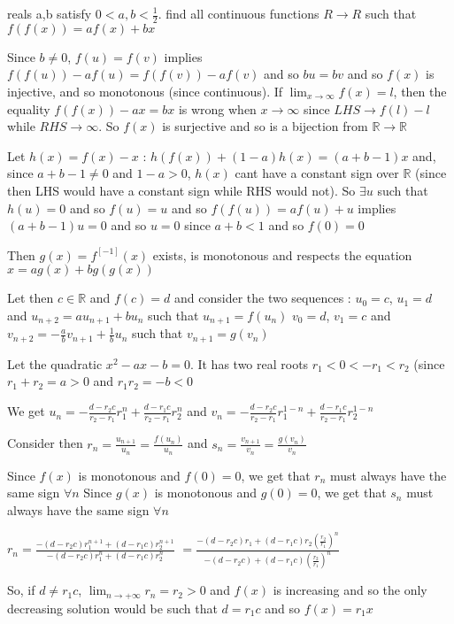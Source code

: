 \begin{solution}
	\begin{tcolorbox}reals a,b satisfy $ 0 < a,b < \frac {1}{2}$. find all continuous functions $ R \to R$ such that $ f(f(x)) = af(x) + bx$\end{tcolorbox}

Since $ b\ne 0$, $ f(u)=f(v)$ implies $ f(f(u))-af(u)=f(f(v))-af(v)$ and so $ bu=bv$ and so $ f(x)$ is injective, and so monotonous (since continuous).
If $ \lim_{x\to\infty}f(x)=l$, then the equality $ f(f(x))-ax=bx$ is wrong when $ x\to\infty$ since $ LHS\to f(l)-l$ while $ RHS\to\infty$. So $ f(x)$ is surjective and so is a bijection from $ \mathbb R\to\mathbb R$

Let $ h(x)=f(x)-x$ : $ h(f(x))+(1-a)h(x)=(a+b-1)x$ and, since $ a+b-1\ne 0$ and $ 1-a>0$, $ h(x)$ cant have a constant sign over $ \mathbb R$ (since then LHS would have a constant sign while RHS would not). So $ \exists u$ such that $ h(u)=0$ and so $ f(u)=u$ and so $ f(f(u))=af(u)+u$ implies $ (a+b-1)u=0$ and so $ u=0$ since $ a+b<1$ and so $ f(0)=0$


Then $ g(x)=f^{[-1]}(x)$ exists, is monotonous and respects the equation $ x=ag(x)+bg(g(x))$

Let then $ c\in\mathbb R$ and $ f(c)=d$ and consider the two sequences :
$ u_0=c$, $ u_1=d$ and $ u_{n+2}=au_{n+1}+bu_n$ such that $ u_{n+1}=f(u_n)$
$ v_0=d$, $ v_1=c$ and $ v_{n+2}=-\frac abv_{n+1}+\frac 1bu_n$ such that $ v_{n+1}=g(v_n)$

Let the quadratic $ x^2-ax-b=0$. It has two real roots $ r_1<0<-r_1<r_2$ (since $ r_1+r_2=a>0$ and $ r_1r_2=-b<0$

We get $ u_n=-\frac{d-r_2c}{r_2-r_1}r_1^n+\frac{d-r_1c}{r_2-r_1}r_2^n$ and $ v_n=-\frac{d-r_2c}{r_2-r_1}r_1^{1-n}+\frac{d-r_1c}{r_2-r_1}r_2^{1-n}$


Consider then $ r_n=\frac{u_{n+1}}{u_n}=\frac{f(u_{n})}{u_n}$ and $ s_n=\frac{v_{n+1}}{v_n}=\frac{g(v_{n})}{v_n}$

Since $ f(x)$ is monotonous and $ f(0)=0$, we get that $ r_n$ must always have the same sign $ \forall n$ 
Since $ g(x)$ is monotonous and $ g(0)=0$, we get that $ s_n$ must always have the same sign $ \forall n$ 

$ r_n=\frac{-(d-r_2c)r_1^{n+1}+(d-r_1c)r_2^{n+1}}{-(d-r_2c)r_1^{n}+(d-r_1c)r_2^{n}}$ $ =\frac{-(d-r_2c)r_1+(d-r_1c)r_2(\frac{r_2}{r_1})^{n}}{-(d-r_2c)+(d-r_1c)(\frac{r_2}{r_1})^{n}}$

So, if $ d\ne r_1c$, $ \lim_{n\to+\infty}r_n=r_2>0$ and $ f(x)$ is increasing and so the only decreasing solution would be such that $ d=r_1c$ and so $ f(x)=r_1x$


\end{solution}
